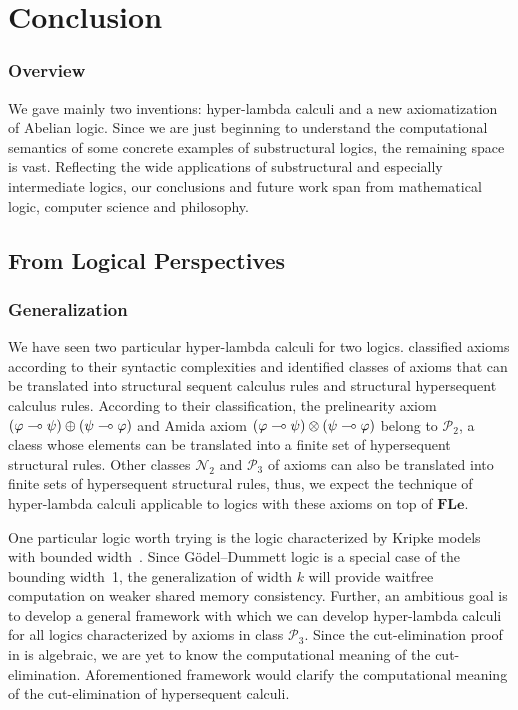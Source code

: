 \chapter{Conclusion}

\subsection{Overview}

We gave mainly two inventions: hyper-lambda calculi and a new
axiomatization of Abelian logic.
Since we are just beginning to understand the computational semantics of
some concrete examples of substructural logics, the remaining space is
vast.
Reflecting the wide applications of substructural and especially
intermediate logics,
our conclusions and future work span from mathematical logic, computer
science and philosophy.

\section{From Logical Perspectives}

\subsection{Generalization}

We have seen two particular hyper-lambda calculi for two logics.
\citet{alg} classified axioms according to their syntactic complexities
and identified classes of axioms that can be translated into structural
sequent calculus rules and structural hypersequent calculus rules.
According to their classification, the prelinearity axiom
$(\varphi\multimap\psi)\oplus(\psi\multimap\varphi)$ and Amida axiom
$(\varphi\multimap\psi)\otimes(\psi\multimap\varphi)$ belong to $\mathcal P_2$, a
claess whose elements can be translated into a finite set of
hypersequent structural rules.
Other classes $\mathcal N_2$ and $\mathcal P_3$ of axioms can also be
translated into finite sets of hypersequent structural rules,
thus, we expect the technique of hyper-lambda calculi applicable to
logics with these axioms on top of $\mathbf{FLe}$.

One particular logic worth trying is
the logic characterized by Kripke models with bounded width~\citep{Ciabattoni01042001}.
Since G\"odel--Dummett logic is a special case of the bounding width~1,
the generalization of width $k$ will provide waitfree computation on
weaker shared memory consistency.  Further,
an ambitious goal is to develop a general framework with which we can
develop hyper-lambda calculi for all logics characterized by axioms in
class $\mathcal P_3$.
Since the cut-elimination proof in \citep{alg} is algebraic,
we are yet to know the computational meaning of the cut-elimination.
Aforementioned framework would clarify the computational meaning of the
cut-elimination of hypersequent calculi.

